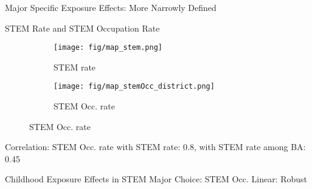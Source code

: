 \documentclass[aspectratio=169,xcolor=dvipsnames]{beamer}
\begin{document}
\begin{frame}{Major Specific Exposure Effects: More Narrowly Defined}\label{tab_major_spec_narrow}
    \begin{table}[!htbp]
	\centering \footnotesize
	\captionsetup{width=1.0\textwidth}
\end{table}
\hyperlink{tab_major_spec}{}
\end{frame}


\begin{frame}{STEM Rate and STEM Occupation Rate}\label{map_stem_stemOcc}
    \begin{figure}[H]
    \centering
	\begin{subfigure}[t]{0.43\textwidth}
        \centering
    		\caption{STEM rate}
    		\texttt{[image: fig/map\_stem.png]}
	\end{subfigure}%
	\begin{subfigure}[t]{0.45\textwidth}
	    \centering
    		\caption{STEM Occ. rate}
    		\texttt{[image: fig/map\_stemOcc\_district.png]}
	\end{subfigure}
	\par\smallskip
    \end{figure}
Correlation: STEM Occ. rate with STEM rate: 0.8, with STEM rate among BA: 0.45  \hyperlink{map_stemOcc}{}
\end{frame}

\begin{frame}{Childhood Exposure Effects in STEM Major Choice: STEM Occ. Linear: Robust}\label{tab_STEMOcc_robust}
    \begin{table}[!htbp]
	\centering \footnotesize
	\captionsetup{width=1.0\textwidth}
\end{table}
\hyperlink{tab_STEMOcc}{}
\end{frame}
\end{document}
